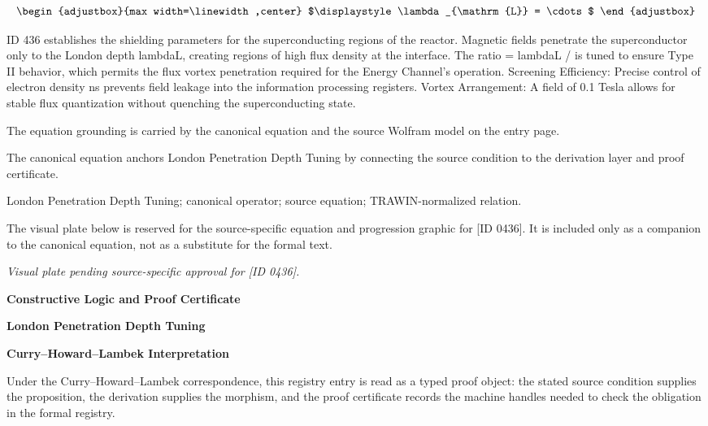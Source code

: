 \[
\begin{adjustbox}{max width=\linewidth,center}
$\displaystyle
\lambda_{\mathrm{L}} = \cdots
$
\end{adjustbox}
\]

ID 436 establishes the shielding parameters for the superconducting regions of the reactor. Magnetic fields penetrate the superconductor only to the London depth lambdaL, creating regions of high flux density at the interface. The ratio = lambdaL / is tuned to ensure Type II behavior, which permits the flux vortex penetration required for the Energy Channel's operation. Screening Efficiency: Precise control of electron density ns prevents field leakage into the information processing registers. Vortex Arrangement: A field of 0.1 Tesla allows for stable flux quantization without quenching the superconducting state.

The equation grounding is carried by the canonical equation and the source Wolfram model on the entry page.

The canonical equation anchors London Penetration Depth Tuning by connecting the source condition to the derivation layer and proof certificate.

London Penetration Depth Tuning; canonical operator; source equation; TRAWIN-normalized relation.
\endgroup

\begingroup\footnotesize\sloppy
The visual plate below is reserved for the source-specific equation and progression graphic for [ID 0436]. It is included only as a companion to the canonical equation, not as a substitute for the formal text.
\par\endgroup
\begingroup\footnotesize\itshape
Visual plate pending source-specific approval for [ID 0436].
\par\endgroup

\clearpage
\begingroup\tzpsupportsetup
\noindent\textbf{\fontsize{10.8pt}{12.8pt}\selectfont [ID 0436] Constructive Logic and Proof Certificate}\par
\noindent\textbf{\fontsize{10pt}{12pt}\selectfont London Penetration Depth Tuning}\par
\vspace{0.45em}
\begingroup
\footnotesize
\setlength{\parskip}{0.22em}
\setlength{\parindent}{0pt}
\noindent\textbf{Curry--Howard--Lambek Interpretation}\par
Under the Curry--Howard--Lambek correspondence, this registry entry is read as a typed proof
object: the stated source condition supplies the proposition, the derivation supplies the
morphism, and the proof certificate records the machine handles needed to check the obligation
in the formal registry.

